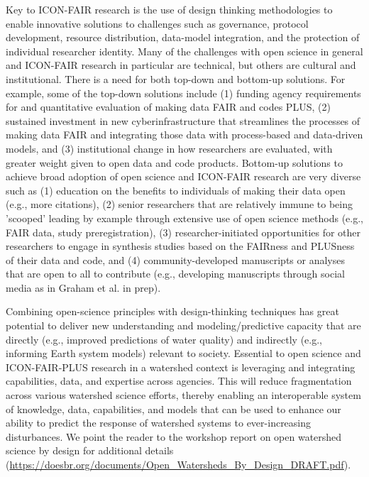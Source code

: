 \documentclass[preprint,review, 12pt]{elsarticle}
\begin{document}
 Key to ICON-FAIR research is the use of design thinking methodologies to enable innovative solutions to challenges such as governance, protocol development, resource distribution, data-model integration, and the protection of individual researcher identity. Many of the challenges with open science in general and ICON-FAIR research in particular are technical, but others are cultural and institutional. There is a need for both top-down and bottom-up solutions. For example, some of the top-down solutions include (1) funding agency requirements for and quantitative evaluation of making data FAIR and codes PLUS, (2) sustained investment in new cyberinfrastructure that streamlines the processes of making data FAIR and integrating those data with process-based and data-driven models, and (3) institutional change in how researchers are evaluated, with greater weight given to open data and code products. Bottom-up solutions to achieve broad adoption of open science and ICON-FAIR research are very diverse such as (1) education on the benefits to individuals of making their data open (e.g., more citations), (2) senior researchers that are relatively immune to being 'scooped' leading by example through extensive use of open science methods (e.g., FAIR data, study preregistration), (3) researcher-initiated opportunities for other researchers to engage in synthesis studies based on the FAIRness and PLUSness of their data and code, and (4) community-developed manuscripts or analyses that are open to all to contribute (e.g., developing manuscripts through social media as in Graham et al. in prep).  

 Combining open-science principles with design-thinking techniques has great potential to deliver new understanding and modeling/predictive capacity that are directly (e.g., improved predictions of water quality) and indirectly (e.g., informing Earth system models) relevant to society. Essential to open science and ICON-FAIR-PLUS research in a watershed context is leveraging and integrating capabilities, data, and expertise across agencies. This will reduce fragmentation across various watershed science efforts, thereby enabling an interoperable system of knowledge, data, capabilities, and models that can be used to enhance our ability to predict the response of watershed systems to ever-increasing disturbances. We point the reader to the workshop report on open watershed science by design for additional details (\url{https://doesbr.org/documents/Open_Watersheds_By_Design_DRAFT.pdf}).
\end{document}
